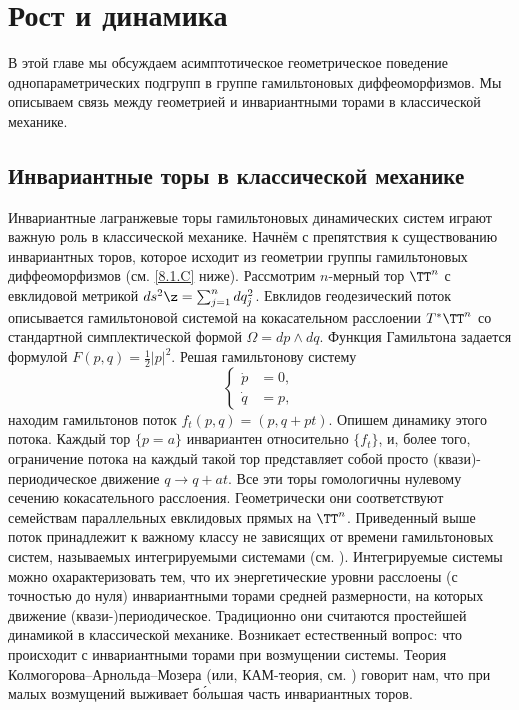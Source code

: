 \chapter{Рост и динамика}

В этой главе мы обсуждаем асимптотическое геометрическое поведение однопараметрических подгрупп в группе гамильтоновых диффеоморфизмов.
Мы описываем связь между геометрией и инвариантными торами в классической механике.

\section{Инвариантные торы в классической механике}

Инвариантные лагранжевые торы гамильтоновых динамических систем играют важную роль в классической механике.
Начнём с препятствия к существованию инвариантных торов, которое исходит из геометрии группы гамильтоновых диффеоморфизмов (см. \ref{8.1.C} ниже).
Рассмотрим $n$-мерный тор $\TT^n$ с евклидовой метрикой $ds^2 \z= \sum^n_{j = 1} dq_j^2$.
Евклидов геодезический поток описывается гамильтоновой системой на кокасательном расслоении $T^\ast \TT^n$ со стандартной симплектической формой $\Omega = dp \wedge dq$.
Функция Гамильтона задается формулой $F (p, q) = \tfrac12 | p |^2$.
Решая гамильтонову систему 
\[
\begin{cases}
\dot p &= 0,\\
\dot q &= p,
\end{cases}
\]
находим гамильтонов поток $f_t (p, q) = (p, q + pt)$.
Опишем динамику этого потока.
Каждый тор $\{p = a\}$ инвариантен относительно $\{f_t\}$, и, более того, ограничение потока на каждый такой тор представляет собой просто (квази)-периодическое движение $q \to q + at$.
Все эти торы гомологичны нулевому сечению кокасательного расслоения.
Геометрически они соответствуют семействам параллельных евклидовых прямых на $\TT^n$.
Приведенный выше поток принадлежит к важному классу не зависящих от времени гамильтоновых систем, называемых интегрируемыми системами (см. \cite{Ar}).
Интегрируемые системы можно охарактеризовать тем, что их энергетические уровни расслоены (с точностью до нуля) инвариантными торами средней размерности, на которых движение (квази-)периодическое.
Традиционно они считаются простейшей динамикой в классической механике.
Возникает естественный вопрос: что происходит с инвариантными торами при возмущении системы.
Теория Колмогорова--Арнольда--Мозера (или, КАМ-теория, см. \cite{Ar}) говорит нам, что при малых возмущений выживает б\'{о}льшая часть инвариантных торов.
